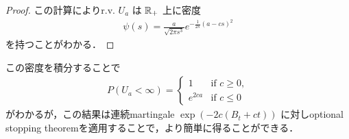 \documentclass{jsarticle}
\begin{document}
\begin{proof}
    この計算によりr.v. $U_a$ は $\mathbb{R}_+$ 上に密度
    \begin{align}
        \psi(s)
        = \frac{a}{\sqrt{2\pi s^3}}e^{-\frac{1}{2s}(a-cs)^2}
    \end{align}
    を持つことがわかる．
\end{proof}

この密度を積分することで
\begin{align}
    P(U_a<\infty)=
    \begin{cases}
        1 &\text{if } c\ge0, \\
        e^{2ca} &\text{if } c\le0
    \end{cases}
\end{align}
がわかるが，この結果は連続martingale $\exp{(-2c(B_t+ct))}$ に対しoptional stopping theoremを適用することで，より簡単に得ることができる\nazo．
\end{document}
